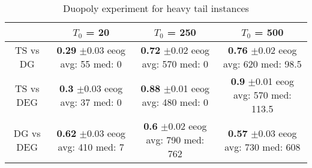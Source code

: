 \documentclass[../competing_bandits.tex]{subfiles}
\begin{document}
\begin{table}[ht]
\centering
\caption{Duopoly experiment for heavy tail instances}
\begin{tabular}{|c|c|c|c|}
  \hline
 & $T_0$ = 20 & $T_0$ = 250 & $T_0$ = 500 \\ 
  \hline
TS vs DG & \makecell{\textbf{0.29} $\pm$0.03\\ eeog \\ avg: 55\\ med: 0} & \makecell{\textbf{0.72} $\pm$0.02\\ eeog \\ avg: 570\\ med: 0} & \makecell{\textbf{0.76} $\pm$0.02\\ eeog \\ avg: 620\\ med: 98.5} \\ 
\hline  
  TS vs DEG & \makecell{\textbf{0.3} $\pm$0.03\\ eeog \\ avg: 37\\ med: 0} & \makecell{\textbf{0.88} $\pm$0.01\\ eeog \\ avg: 480\\ med: 0} & \makecell{\textbf{0.9} $\pm$0.01\\ eeog \\ avg: 570\\ med: 113.5} \\ 
\hline  
  DG vs DEG & \makecell{\textbf{0.62} $\pm$0.03\\ eeog \\ avg: 410\\ med: 7} & \makecell{\textbf{0.6} $\pm$0.02\\ eeog \\ avg: 790\\ med: 762} & \makecell{\textbf{0.57} $\pm$0.03\\ eeog \\ avg: 730\\ med: 608} \\ 
   \hline
\end{tabular}
\label{sim_ht}
\end{table}
\end{document}
